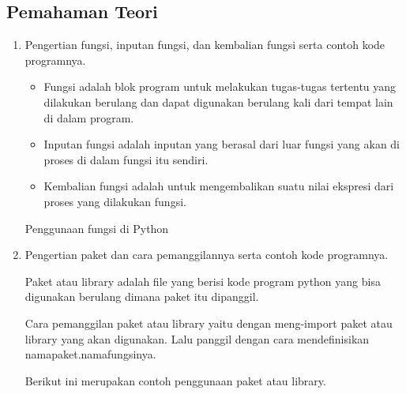 \subsection{Pemahaman Teori}
\begin{enumerate}
	
	\item Pengertian fungsi, inputan fungsi, dan kembalian fungsi serta contoh kode programnya.
	
	\begin{itemize}
		
		\item Fungsi adalah blok program untuk melakukan tugas-tugas tertentu yang dilakukan berulang dan dapat digunakan berulang kali dari tempat lain di dalam program.
		
		
		\item Inputan fungsi adalah inputan yang berasal dari luar fungsi yang akan di proses di dalam fungsi itu sendiri.
		
		
		\item Kembalian fungsi adalah untuk mengembalikan suatu nilai ekspresi dari proses yang dilakukan fungsi.
		
		
	\end{itemize}
	
	Penggunaan fungsi di Python
	
	
	\item Pengertian paket dan cara pemanggilannya serta contoh kode programnya.
	
	Paket atau library adalah file yang berisi kode program python yang bisa digunakan berulang dimana paket itu dipanggil.
	
	Cara pemanggilan paket atau library yaitu dengan meng-import paket atau library yang akan digunakan. Lalu panggil dengan cara mendefinisikan namapaket.namafungsinya.
	
	Berikut ini merupakan contoh penggunaan paket atau library.
	
	

\end{enumerate}
